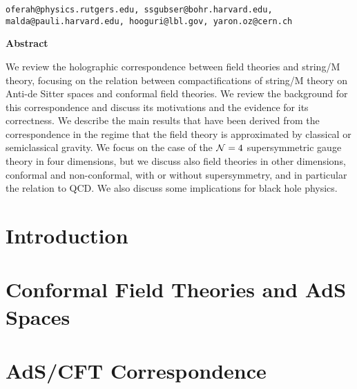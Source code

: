 \begin{titlepage}
\begin{center}
{\tt oferah@physics.rutgers.edu, ssgubser@bohr.harvard.edu, 
 malda@pauli.harvard.edu, hooguri@lbl.gov, yaron.oz@cern.ch}



\vspace{5mm}

{\bf Abstract}
\end{center}

\noindent
We review the holographic correspondence between field theories
and string/M theory, focusing on the relation between
compactifications of string/M theory on Anti-de Sitter spaces and
conformal field theories.  We review the background for this 
correspondence
and discuss its motivations and the evidence for its correctness. We
describe the main results that have been derived from the
correspondence in the regime that the field theory is approximated 
by classical or semiclassical gravity.
 We focus on the case of the ${\cal N}=4$ supersymmetric
gauge theory in four
dimensions, but we discuss also field theories in other dimensions,
conformal and non-conformal, with or without supersymmetry, and in
particular the relation to QCD. We also discuss some implications 
for black hole physics.

\end{titlepage}

\newpage
\tableofcontents
\newpage


\chapter{Introduction}
\label{ChapIntro}









\chapter{Conformal Field Theories and AdS Spaces}
\label{ChapCFT}





\chapter{AdS/CFT Correspondence}
\label{ChapCorrBasic}

